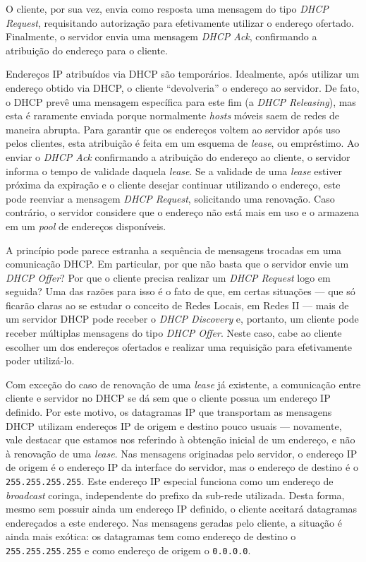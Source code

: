 \documentclass{article}
\begin{document}
O cliente, por sua vez, envia como resposta uma mensagem do tipo \textit{DHCP Request}, requisitando autorização para efetivamente utilizar o endereço ofertado. Finalmente, o servidor envia uma mensagem \textit{DHCP Ack}, confirmando a atribuição do endereço para o cliente.

Endereços IP atribuídos via DHCP são temporários. Idealmente, após utilizar um endereço obtido via DHCP, o cliente ``devolveria'' o endereço ao servidor. De fato, o DHCP prevê uma mensagem específica para este fim (a \textit{DHCP Releasing}), mas esta é raramente enviada porque normalmente \textit{hosts} móveis saem de redes de maneira abrupta. Para garantir que os endereços voltem ao servidor após uso pelos clientes, esta atribuição é feita em um esquema de \textit{lease}, ou empréstimo. Ao enviar o \textit{DHCP Ack} confirmando a atribuição do endereço ao cliente, o servidor informa o tempo de validade daquela \textit{lease}. Se a validade de uma \textit{lease} estiver próxima da expiração e o cliente desejar continuar utilizando o endereço, este pode reenviar a mensagem \textit{DHCP Request}, solicitando uma renovação. Caso contrário, o servidor considere que o endereço não está mais em uso e o armazena em um \textit{pool} de endereços disponíveis.

A princípio pode parece estranha a sequência de mensagens trocadas em uma comunicação DHCP. Em particular, por que não basta que o servidor envie um \textit{DHCP Offer}? Por que o cliente precisa realizar um \textit{DHCP Request} logo em seguida? Uma das razões para isso é o fato de que, em certas situações --- que só ficarão claras ao se estudar o conceito de Redes Locais, em Redes II --- mais de um servidor DHCP pode receber o \textit{DHCP Discovery} e, portanto, um cliente pode receber múltiplas mensagens do tipo \textit{DHCP Offer}. Neste caso, cabe ao cliente escolher um dos endereços ofertados e realizar uma requisição para efetivamente poder utilizá-lo.

Com exceção do caso de renovação de uma \textit{lease} já existente, a comunicação entre cliente e servidor no DHCP se dá sem que o cliente possua um endereço IP definido. Por este motivo, os datagramas IP que transportam as mensagens DHCP utilizam endereços IP de origem e destino pouco usuais --- novamente, vale destacar que estamos nos referindo à obtenção inicial de um endereço, e não à renovação de uma \textit{lease}. Nas mensagens originadas pelo servidor, o endereço IP de origem é o endereço IP da interface do servidor, mas o endereço de destino é o \texttt{255.255.255.255}. Este endereço IP especial funciona como um endereço de \textit{broadcast} coringa, independente do prefixo da sub-rede utilizada. Desta forma, mesmo sem possuir ainda um endereço IP definido, o cliente aceitará datagramas endereçados a este endereço. Nas mensagens geradas pelo cliente, a situação é ainda mais exótica: os datagramas tem como endereço de destino  o \texttt{255.255.255.255} e como endereço de origem o \texttt{0.0.0.0}.
\end{document}
